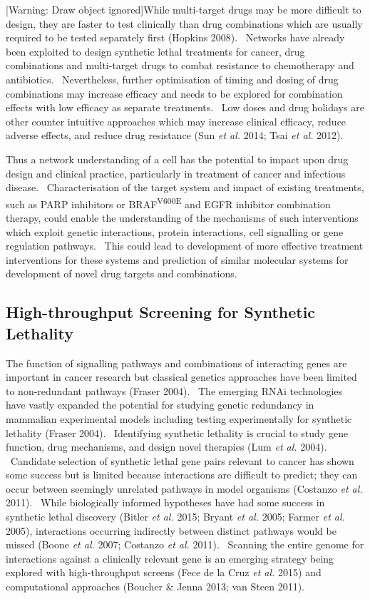 [Warning: Draw object ignored]While multi-target drugs may be more
difficult to design, they are faster to test clinically than drug
combinations which are usually required to be tested separately first
(Hopkins 2008). \ Networks have already been exploited to design
synthetic lethal treatments for cancer, drug combinations and
multi-target drugs to combat resistance to chemotherapy and
antibiotics. \ Nevertheless, further optimisation of timing and dosing
of drug combinations may increase efficacy and needs to be explored for
combination effects with low efficacy as separate treatments. \ Low
doses and drug holidays are other counter intuitive approaches which
may increase clinical efficacy, reduce adverse effects, and reduce drug
resistance (Sun\textit{ et al.} 2014; Tsai\textit{ et al.} 2012). \ 


Thus a network understanding of a cell has the potential to impact upon
drug design and clinical practice, particularly in treatment of cancer
and infectious disease. \ Characterisation of the target system and
impact of existing treatments, such as PARP inhibitors or
BRAF\textsuperscript{V600E} and EGFR inhibitor combination therapy,
could enable the understanding of the mechanisms of such interventions
which exploit genetic interactions, protein interactions, cell
signalling or gene regulation pathways. \ This could lead to
development of more effective treatment interventions for these systems
and prediction of similar molecular systems for development of novel
drug targets and combinations. \ 


\subsection[High{}-throughput Screening for Synthetic
Lethality]{High-throughput Screening for Synthetic Lethality}

The function of signalling pathways and combinations of interacting
genes are important in cancer research but classical genetics
approaches have been limited to non-redundant pathways (Fraser 2004).
\ The emerging RNAi technologies have vastly expanded the potential for
studying genetic redundancy in mammalian experimental models including
testing experimentally for synthetic lethality (Fraser 2004).
\ Identifying synthetic lethality is crucial to study gene function,
drug mechanisms, and design novel therapies (Lum\textit{ et al.} 2004).
\ Candidate selection of synthetic lethal gene pairs relevant to cancer
has shown some success but is limited because interactions are
difficult to predict; they can occur between seemingly unrelated
pathways in model organisms (Costanzo\textit{ et al.} 2011). \ While
biologically informed hypotheses have had some success in synthetic
lethal discovery (Bitler\textit{ et al.} 2015; Bryant\textit{ et al.}
2005; Farmer\textit{ et al.} 2005), interactions occurring indirectly
between distinct pathways would be missed (Boone\textit{ et al.} 2007;
Costanzo\textit{ et al.} 2011). \ Scanning the entire genome for
interactions against a clinically relevant gene is an emerging strategy
being explored with high-throughput screens (Fece de la Cruz\textit{ et
al.} 2015) and computational approaches (Boucher \& Jenna 2013; van
Steen 2011). \ 


